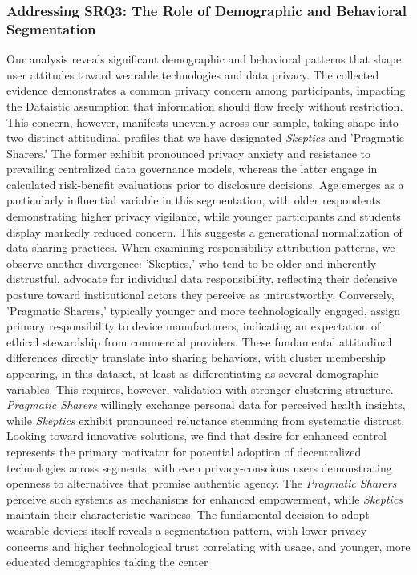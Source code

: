 	\subsubsection{Addressing SRQ3: The Role of Demographic and Behavioral Segmentation}
	Our analysis reveals significant demographic and behavioral patterns that shape user attitudes toward wearable technologies and data privacy. The collected evidence demonstrates a common privacy concern among participants, impacting the Dataistic assumption that information should flow freely without restriction. This concern, however, manifests unevenly across our sample, taking shape into two distinct attitudinal profiles that we have designated \textit{Skeptics} and 'Pragmatic Sharers.' The former exhibit pronounced privacy anxiety and resistance to prevailing centralized data governance models, whereas the latter engage in calculated risk-benefit evaluations prior to disclosure decisions. Age emerges as a particularly influential variable in this segmentation, with older respondents demonstrating higher privacy vigilance, while younger participants and students display markedly reduced concern. This suggests a generational normalization of data sharing practices. When examining responsibility attribution patterns, we observe another divergence: 'Skeptics,' who tend to be older and inherently distrustful, advocate for individual data responsibility, reflecting their defensive posture toward institutional actors they perceive as untrustworthy. Conversely, 'Pragmatic Sharers,' typically younger and more technologically engaged, assign primary responsibility to device manufacturers, indicating an expectation of ethical stewardship from commercial providers. These fundamental attitudinal differences directly translate into sharing behaviors, with cluster membership appearing, in this dataset, at least as differentiating as several demographic variables. This requires, however, validation with stronger clustering structure. \textit{Pragmatic Sharers} willingly exchange personal data for perceived health insights, while \textit{Skeptics} exhibit pronounced reluctance stemming from systematic distrust. Looking toward innovative solutions, we find that desire for enhanced control represents the primary motivator for potential adoption of decentralized technologies across segments, with even privacy-conscious users demonstrating openness to alternatives that promise authentic agency. The \textit{Pragmatic Sharers} perceive such systems as mechanisms for enhanced empowerment, while \textit{Skeptics} maintain their characteristic wariness. The fundamental decision to adopt wearable devices itself reveals a segmentation pattern, with lower privacy concerns and higher technological trust correlating with usage, and younger, more educated demographics taking the center 